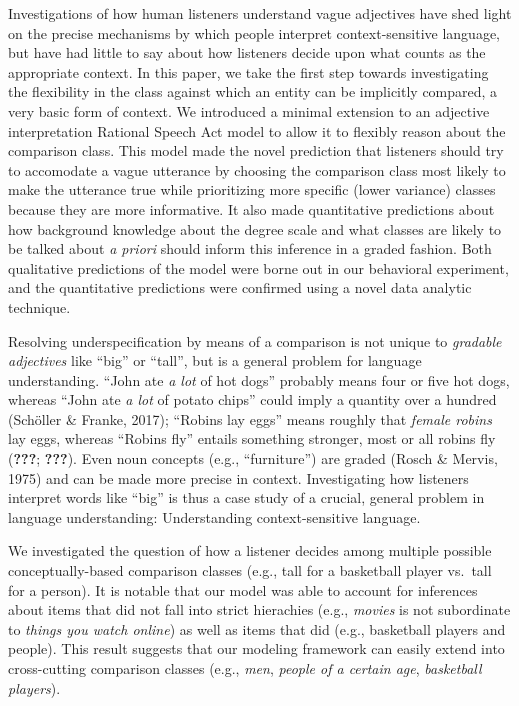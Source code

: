 \documentclass[doc]{apa6}
\begin{document}
Investigations of how human listeners understand vague adjectives have
shed light on the precise mechanisms by which people interpret
context-sensitive language, but have had little to say about how
listeners decide upon what counts as the appropriate context. In this
paper, we take the first step towards investigating the flexibility in
the class against which an entity can be implicitly compared, a very
basic form of context. We introduced a minimal extension to an adjective
interpretation Rational Speech Act model to allow it to flexibly reason
about the comparison class. This model made the novel prediction that
listeners should try to accomodate a vague utterance by choosing the
comparison class most likely to make the utterance true while
prioritizing more specific (lower variance) classes because they are
more informative. It also made quantitative predictions about how
background knowledge about the degree scale and what classes are likely
to be talked about \emph{a priori} should inform this inference in a
graded fashion. Both qualitative predictions of the model were borne out
in our behavioral experiment, and the quantitative predictions were
confirmed using a novel data analytic technique.

Resolving underspecification by means of a comparison is not unique to
\emph{gradable adjectives} like ``big'' or ``tall'', but is
a general problem for language understanding. ``John ate \emph{a
lot} of hot dogs'' probably means four or five hot dogs, whereas
``John ate \emph{a lot} of potato chips'' could imply a quantity
over a hundred (Schöller \& Franke, 2017); ``Robins lay eggs''
means roughly that \emph{female robins} lay eggs, whereas
``Robins fly'' entails something stronger, most or all robins fly
({\textbf{???}}; {\textbf{???}}). Even noun concepts (e.g.,
``furniture'') are graded (Rosch \& Mervis, 1975) and can be made
more precise in context. Investigating how listeners interpret words
like ``big'' is thus a case study of a crucial, general problem in
language understanding: Understanding context-sensitive language.

We investigated the question of how a listener decides among multiple
possible conceptually-based comparison classes (e.g., tall for a
basketball player vs.~tall for a person). It is notable that our model
was able to account for inferences about items that did not fall into
strict hierachies (e.g., \emph{movies} is not subordinate to
\emph{things you watch online}) as well as items that did (e.g.,
basketball players and people). This result suggests that our modeling
framework can easily extend into cross-cutting comparison classes (e.g.,
\emph{men}, \emph{people of a certain age}, \emph{basketball players}).
\end{document}
